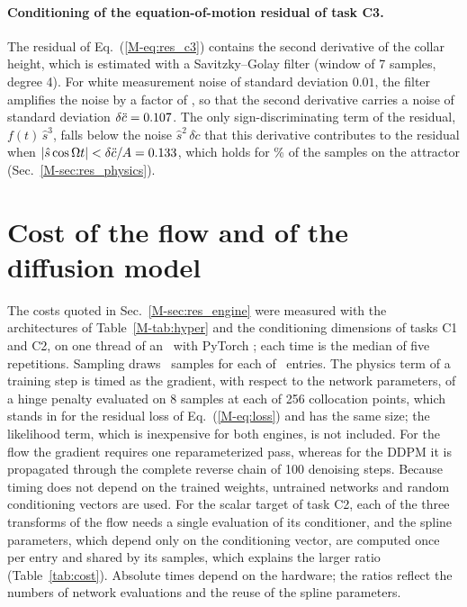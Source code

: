 \documentclass[10pt,letterpaper]{article}
\newcommand{\mref}[1]{\ref{M-#1}}
\begin{document}
\begin{table}[!htbp]
\caption{Original FPRM (GPR on the delay window of the spring force) trained on all labeled samples, task C1 at $90\%$ missing data.}
\label{tab:fullgp}
\centering\footnotesize

\end{table}

\paragraph{Conditioning of the equation-of-motion residual of task C3.} The residual of Eq.~(\mref{eq:res_c3}) contains the second derivative of the collar height, which is estimated with a Savitzky--Golay filter (window of 7 samples, degree 4). For white measurement noise of standard deviation $0.01$, the filter amplifies the noise by a factor of \SGgain, so that the second derivative carries a noise of standard deviation $\delta\ddot c=0.107$. The only sign-discriminating term of the residual, $f(t)\,\hat s^{3}$, falls below the noise $\hat s^{2}\,\delta\ddot c$ that this derivative contributes to the residual when $|\hat s\cos\Omega t|<\delta\ddot c/A=0.133$, which holds for \fracbelow\% of the samples on the attractor (Sec.~\mref{sec:res_physics}).

\clearpage
\section{Cost of the flow and of the diffusion model}\label{sec:cost}

The costs quoted in Sec.~\mref{sec:res_engine} were measured with the architectures of Table~\mref{tab:hyper} and the conditioning dimensions of tasks C1 and C2, on one thread of an \costcpu\ with PyTorch \torchver; each time is the median of five repetitions. Sampling draws \costsamples\ samples for each of \costrows\ entries. The physics term of a training step is timed as the gradient, with respect to the network parameters, of a hinge penalty evaluated on 8 samples at each of 256 collocation points, which stands in for the residual loss of Eq.~(\mref{eq:loss}) and has the same size; the likelihood term, which is inexpensive for both engines, is not included. For the flow the gradient requires one reparameterized pass, whereas for the DDPM it is propagated through the complete reverse chain of 100 denoising steps. Because timing does not depend on the trained weights, untrained networks and random conditioning vectors are used. For the scalar target of task C2, each of the three transforms of the flow needs a single evaluation of its conditioner, and the spline parameters, which depend only on the conditioning vector, are computed once per entry and shared by its samples, which explains the larger ratio (Table~\ref{tab:cost}). Absolute times depend on the hardware; the ratios reflect the numbers of network evaluations and the reuse of the spline parameters.
\end{document}
